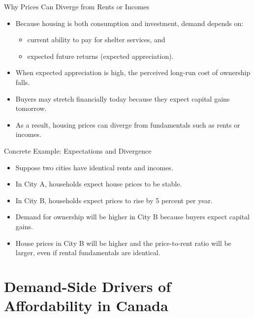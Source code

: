 \documentclass[aspectratio=169]{beamer}
\begin{document}
\begin{frame}{Why Prices Can Diverge from Rents or Incomes}
\transfade
\begin{itemize}[<+->]
  \item Because housing is both consumption and investment, demand depends on:
  \begin{itemize}[<+->]
    \item current ability to pay for shelter services, and
    \item expected future returns (expected appreciation).
  \end{itemize}
  \item When expected appreciation is high, the perceived long-run cost of ownership falls.
  \item Buyers may stretch financially today because they expect capital gains tomorrow.
  \item As a result, housing prices can diverge from fundamentals such as rents or incomes.
\end{itemize}
\end{frame}


\begin{frame}{Concrete Example: Expectations and Divergence}
\transfade
\begin{itemize}[<+->]
  \item Suppose two cities have identical rents and incomes.
  \item In City A, households expect house prices to be stable.
  \item In City B, households expect prices to rise by 5 percent per year.
  \item Demand for ownership will be higher in City B because buyers expect capital gains.
  \item House prices in City B will be higher and the price-to-rent ratio will be larger, even if rental fundamentals are identical.
\end{itemize}
\end{frame}

\section{Demand-Side Drivers of Affordability in Canada}
\end{document}
